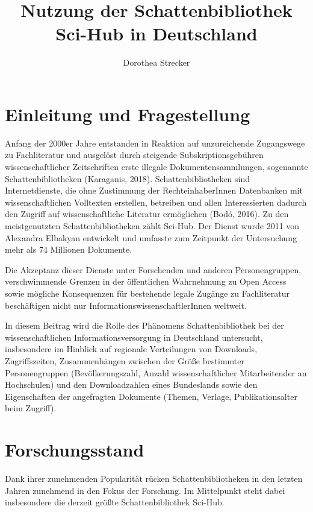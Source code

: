 \documentclass[a4paper,
fontsize=11pt,
oneside,
numbers=noperiodatend,
parskip=half-,
bibliography=totoc,
final
]{scrartcl}
\title{\LARGE{Nutzung der Schattenbibliothek Sci-Hub in Deutschland}}
\author{Dorothea Strecker} %
\date{}
\begin{document}
\maketitle
\thispagestyle{fancyplain} 


\hypertarget{einleitung-und-fragestellung}{%
\section{Einleitung und
Fragestellung}\label{einleitung-und-fragestellung}}

Anfang der 2000er Jahre entstanden in Reaktion auf unzureichende
Zugangswege zu Fachliteratur und ausgelöst durch steigende
Subskriptionsgebühren wissenschaftlicher Zeitschriften erste illegale
Dokumentensammlungen, sogenannte Schattenbibliotheken (Karaganis, 2018).
Schattenbibliotheken sind Internetdienste, die ohne Zustimmung der
RechteinhaberInnen Datenbanken mit wissenschaftlichen Volltexten
erstellen, betreiben und allen Interessierten dadurch den Zugriff auf
wissenschaftliche Literatur ermöglichen (Bodó, 2016). Zu den
meistgenutzten Schattenbibliotheken zählt Sci-Hub. Der Dienst wurde 2011
von Alexandra Elbakyan entwickelt und umfasste zum Zeitpunkt der
Untersuchung mehr als 74 Millionen Dokumente.

Die Akzeptanz dieser Dienste unter Forschenden und anderen
Personengruppen, verschwimmende Grenzen in der öffentlichen Wahrnehmung
zu Open Access sowie mögliche Konsequenzen für bestehende legale Zugänge
zu Fachliteratur beschäftigen nicht nur InformationswissenschaftlerInnen
weltweit.

In diesem Beitrag wird die Rolle des Phänomens Schattenbibliothek bei
der wissenschaftlichen Informationsversorgung in Deutschland untersucht,
insbesondere im Hinblick auf regionale Verteilungen von Downloads,
Zugriffszeiten, Zusammenhängen zwischen der Größe bestimmter
Personengruppen (Bevölkerungszahl, Anzahl wissenschaftlicher
Mitarbeitender an Hochschulen) und den Downloadzahlen eines Bundeslands
sowie den Eigenschaften der angefragten Dokumente (Themen, Verlage,
Publikationsalter beim Zugriff).

\hypertarget{forschungsstand}{%
\section{Forschungsstand}\label{forschungsstand}}

Dank ihrer zunehmenden Popularität rücken Schattenbibliotheken in den
letzten Jahren zunehmend in den Fokus der Forschung. Im Mittelpunkt
steht dabei insbesondere die derzeit größte Schattenbibliothek Sci-Hub.
\end{document}

